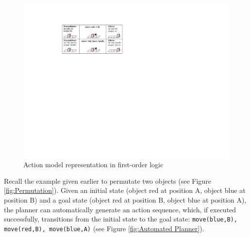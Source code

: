   \begin{figure}[h]
    \centering
    \includegraphics[scale=0.4]{figures/schema-logic}
    \caption{Action model representation in first-order logic}
    \label{fig:Pick-up action model}
  \end{figure}
Recall the example given earlier to permutate two objects (see Figure \ref{fig:Permutation}). Given an initial state (object red at position A, object blue at position B) and a goal state (object red at position B, object blue at position A), the planner can automatically generate an action sequence, which, if executed successfully, transitions from the initial state to the goal state: \texttt{move(blue,B), move(red,B), move(blue,A)} (see Figure \ref{fig:Automated Planner}).

